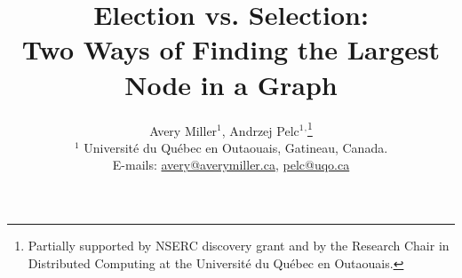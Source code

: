 \documentclass[11pt]{article}
\begin{document}
\baselineskip  0.18in \parskip     0.0in \parindent   0.2in 

\title{{\bf Election vs. Selection:\\ Two Ways of Finding the Largest Node in a Graph}}
\date{}
\newcommand{\inst}[1]{$^{#1}$}

\author{
Avery Miller\inst{1},
Andrzej Pelc\inst{1}$^,$\footnote{Partially supported by NSERC discovery grant and by the Research Chair in Distributed Computing at the Universit\'e du Qu\'{e}bec en Outaouais.}\\
\inst{1} Universit\'{e} du Qu\'{e}bec en Outaouais, Gatineau, Canada.\\
E-mails: \url{avery@averymiller.ca}, \url{pelc@uqo.ca}\\
}

\date{ }
\maketitle
\end{document}
